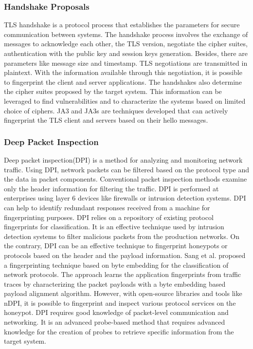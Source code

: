 \subsubsection{Handshake Proposals}
TLS handshake is a protocol process that establishes the parameters for secure communication between systems. The handshake process involves the exchange of messages to acknowledge each other, the TLS version,  negotiate the cipher suites, authentication with the public key and session keys generation. Besides, there are parameters like message size and timestamp. TLS negotiations are transmitted in plaintext. With the information available through this negotiation, it is possible to fingerprint the client and server applications.  The handshakes also determine the cipher suites proposed by the target system. This information can be leveraged to find vulnerabilities and to characterize the systems based on limited choice of ciphers. JA3 and JA3s\cite{JA3} are techniques developed that can actively fingerprint the TLS client and servers based on their hello messages.


\subsubsection{Deep Packet Inspection}
Deep packet inspection(DPI) is a method for analyzing and monitoring network traffic. Using DPI, network packets can be filtered based on the protocol type and the data in packet components. Conventional packet inspection methods examine only the header information for filtering the traffic. DPI is performed at enterprises using layer 6 devices like firewalls or intrusion detection systems. DPI can help to identify redundant responses received from a machine for fingerprinting purposes. DPI relies on a repository of existing protocol fingerprints for classification. It is an effective technique used by intrusion detection systems  to filter malicious packets from the production networks. On the contrary, DPI can be an effective technique to fingerprint honeypots or protocols based on the header and the payload information. Sang et al.\cite{Sang} proposed a fingerprinting technique based on byte embedding for the classification of network protocols. The approach learns the application fingerprints from traffic traces by characterizing the packet payloads with a byte embedding based payload alignment algorithm. However, with open-source libraries and tools like nDPI\cite{nDPI}, it is possible to fingerprint and inspect various protocol services on the honeypot. DPI requires good knowledge of packet-level communication and networking. It is an advanced probe-based method that requires advanced knowledge for the creation of probes to retrieve specific information from the target system.  


